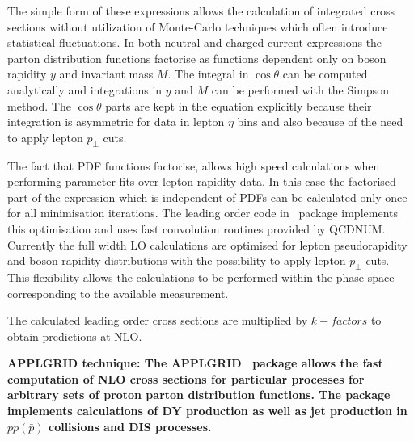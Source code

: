 \begin{description}
The simple form of these expressions allows the calculation of integrated
cross sections without utilization of Monte-Carlo techniques which often 
introduce statistical fluctuations.
In both neutral and charged current expressions the parton distribution functions
factorise as functions dependent only on boson rapidity \(y\) and
invariant mass \(M\).
The integral in \(\cos\theta\) can be computed analytically and
integrations in \(y\) and \(M\) can be performed with the Simpson
method. The \(\cos\theta\) parts are kept in the equation 
explicitly because their integration is asymmetric for
data in lepton \(\eta\) bins and also because of the need to apply 
lepton \(p_{\perp}\) cuts.

The fact that PDF functions factorise, allows high speed calculations when 
performing parameter fits over lepton rapidity data. In this case
the factorised part of the expression which is independent of PDFs can be
calculated only once for all minimisation iterations.
The leading order code in \fitter\ package implements this 
optimisation and uses fast convolution routines provided by
QCDNUM. Currently the full width LO calculations are optimised 
for lepton pseudorapidity and boson rapidity distributions with the
possibility to apply lepton \(p_{\perp}\) cuts.
This flexibility allows the calculations to be performed within the phase space
corresponding to the available measurement.

The calculated leading order cross sections are multiplied by
$k-factors$ to obtain predictions at NLO.
\\
\item \bf {APPLGRID technique:} \rm
The APPLGRID~\cite{Carli:2010rw} package allows the fast computation 
of NLO cross sections for particular processes for arbitrary sets of 
proton parton distribution functions. The package implements
calculations of DY production as well as jet production in $pp(\bar p)$
collisions and DIS processes. 


\end{description}
